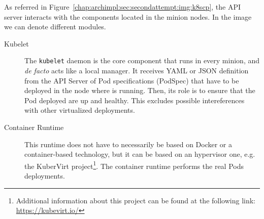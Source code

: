 As referred in Figure~\ref{chap:archimpl:sec:secondattempt:img:k8scp}, the API
server interacts with the components located in the minion nodes. In the image
we can denote different modules.
\begin{description}
\item[Kubelet] The \verb!kubelet! daemon is the core component that runs in
  every minion, and \emph{de facto} acts like a local manager. It receives YAML
  or JSON definition from the API Server of Pod specifications (PodSpec) that
  have to be deployed in the node where is running. Then, its role is to ensure
  that the Pod deployed are up and healthy. This excludes possible
  intereferences with other virtualized deployments.
\item[Container Runtime] This runtime does not have to necessarily be based on
  Docker or a container-based technology, but it can be based on an hypervisor
  one, e.g. the KuberVirt project\footnote{Additional information about this
    project can be found at the following link: \url{https://kubevirt.io/}}. The
  container runtime performs the real Pods deployments.


\end{description}
